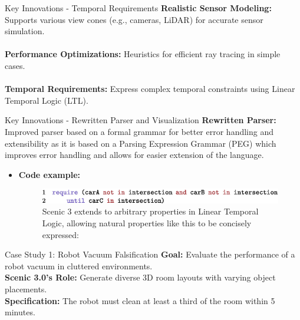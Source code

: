 \documentclass{beamer}
\begin{document}
\begin{frame}{Key Innovations - Temporal Requirements}
\textbf{Realistic Sensor Modeling:} Supports various view cones (e.g., cameras, LiDAR) for accurate sensor simulation.\\\\
\textbf{Performance Optimizations:} Heuristics for efficient ray tracing in simple cases.\\\\
\textbf{Temporal Requirements:} Express complex temporal constraints using Linear Temporal Logic (LTL).
\end{frame}

\begin{frame}{Key Innovations - Rewritten Parser and Visualization}
\textbf{Rewritten Parser:} Improved parser based on a formal grammar for better error handling and extensibility as it is based on a Parsing Expression Grammar (PEG) which improves error handling and allows for easier extension of the language.
\begin{itemize}
\setlength{\itemindent}{-1em}
\item \textbf{Code example:}
    \begin{figure}
    \centering
      \includegraphics[width=1\linewidth]{FIG8.png}
        \caption{Scenic 3 extends  to arbitrary properties in Linear Temporal Logic, allowing natural properties like this to be concisely expressed:}
        \label{fig:Linear-Temporal-Logic}
    \end{figure}
\end{itemize}
\end{frame}


\begin{frame}{Case Study 1: Robot Vacuum Falsification}
    \textbf{Goal:} Evaluate the performance of a robot vacuum in cluttered environments.\\
    \textbf{Scenic 3.0's Role:} Generate diverse 3D room layouts with varying object placements.\\
    \textbf{Specification:} The robot must clean at least a third of the room within 5 minutes.
\end{frame}
\end{document}
